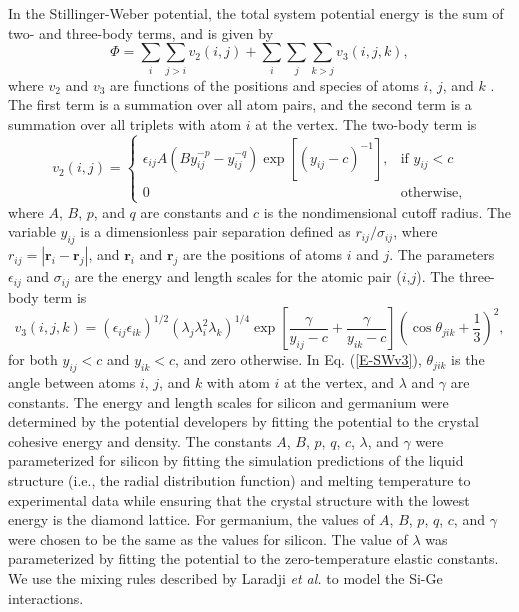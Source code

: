 \documentclass[letterpaper,12pt]{article}
\begin{document}
In the Stillinger-Weber potential, the total system potential energy
is the sum of two- and three-body terms, and is given by
\begin{equation}
\Phi = \sum_i \sum_{j>i} v_2(i,j) + \sum_i \sum_j \sum_{k>j}
v_3(i,j,k), \label{E-SW}
\end{equation}
where $v_2$ and $v_3$ are functions of the positions and species of
atoms $i$, $j$, and $k$ \cite{stillinger1985}. The first term is a
summation over all atom pairs, and the second term is a summation
over all triplets with atom $i$ at the vertex. The two-body term is
\begin{equation}
v_2(i,j) = \left\{ \begin{array}{ll} \epsilon_{ij} A(B y_{ij}^{-p}
- y_{ij}^{-q})\exp[(y_{ij} - c)^{-1}], & \mbox{if $y_{ij} < c$} \\
0 & \mbox{otherwise}, \end{array} \right. \label{E-SWv2}
\end{equation}
where $A$, $B$, $p$, and $q$ are constants and $c$ is the
nondimensional cutoff radius. The variable $y_{ij}$ is a
dimensionless pair separation defined as $r_{ij}/\sigma_{ij}$, where
$r_{ij} = |\mathbf{r}_i - \mathbf{r}_j|$, and $\mathbf{r}_i$ and
$\mathbf{r}_j$ are the positions of atoms $i$ and $j$. The
parameters $\epsilon_{ij}$ and $\sigma_{ij}$ are the energy and
length scales for the atomic pair ($i$,$j$). The three-body term is
\begin{equation}
v_3(i,j,k) = (\epsilon_{ij}\epsilon_{ik})^{1/2} (\lambda_j
\lambda_i^2 \lambda_k)^{1/4} \exp\left[\frac{\gamma}{y_{ij} - c} +
\frac{\gamma}{y_{ik} - c} \right] \left( \cos \theta_{jik} +
\frac{1}{3} \right)^2, \label{E-SWv3}
\end{equation}
for both $y_{ij} < c$ and $y_{ik} < c$, and zero otherwise. In Eq.
(\ref{E-SWv3}), $\theta_{jik}$ is the angle between atoms $i$, $j$,
and $k$ with atom $i$ at the vertex, and $\lambda$ and $\gamma$ are
constants. The energy and length scales for silicon and germanium
were determined by the potential developers by fitting the potential
to the crystal cohesive energy and
density.\cite{stillinger1985,ding1986} The constants $A$, $B$, $p$,
$q$, $c$, $\lambda$, and $\gamma$ were parameterized for silicon by
fitting the simulation predictions of the liquid structure (i.e.,
the radial distribution function) and melting temperature to
experimental data while ensuring that the crystal structure with the
lowest energy is the diamond lattice.\cite{stillinger1985} For
germanium, the values of $A$, $B$, $p$, $q$, $c$, and $\gamma$ were
chosen to be the same as the values for silicon.\cite{ding1986} The
value of $\lambda$ was parameterized by fitting the potential to the
zero-temperature elastic constants.\cite{ding1986} We use the mixing
rules described by Laradji \textit{et al.} to model the Si-Ge
interactions.\cite{laradji1995}
\end{document}
